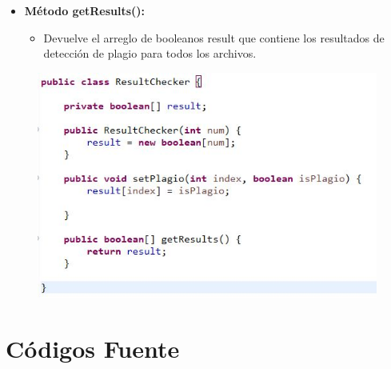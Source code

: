 \documentclass{article}
\begin{document}
	\begin{itemize}
	\item \textbf{Método getResults():}
	 \begin{itemize}
	 \item Devuelve el arreglo de booleanos result que contiene los resultados de detección de plagio para todos los archivos.
	 \end{itemize}
	\end{itemize}
	 \begin{figure}[H]
		\centering
		\includegraphics[width=1\textwidth,keepaspectratio]{img/RC.jpg}
	\end{figure}
	 
 	
	\section{Códigos Fuente}	
	
	
	
	
	
	 
	
	
\end{document}
